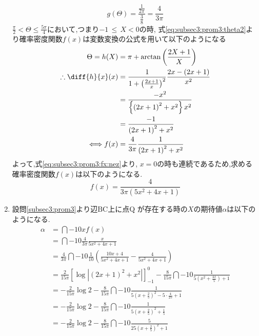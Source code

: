 \documentclass[dvipdfmx,titlepage, 11pt, a4paper]{jsarticle}%
\begin{document}
\begin{enumerate}[(1)]
  \begin{equation*}
    g(\Theta) = \frac{\frac{1}{2\pi}}{\frac{3}{8}} = \frac{4}{3\pi}
  \end{equation*}
  $\frac{\pi}{2} < \Theta \leq \frac{5\pi}{4}$において,つまり$ -1\, \leq\, X < 0$の時,
  式\eqref{eq:subsec3:prom3:theta2}より確率密度関数$f(x)$は変数変換の公式を用いて以下のようになる
  \begin{align}
    \Theta = h(X) &= \pi + \arctan\left(\frac{2X + 1}{X}\right) \nonumber\\
    \therefore \diff{h}{x}(x) &= \frac{1}{1 + \left(\frac{2x + 1}{x}\right)^2}\frac{2x - (2x + 1)}{x^2}\nonumber\\
                  &= \frac{-x^2}{\left\{\left(2x + 1\right)^2 + x^2\right\}x^2}\nonumber\\
                  &= \frac{-1}{\left(2x + 1\right)^2 + x^2}\nonumber\\
    \Longleftrightarrow 
    f(x) &= \frac{4}{3\pi}\frac{1}{\left(2x + 1\right)^2 + x^2}\label{eq:subsec3:prom3:fx:nez}
  \end{align}
  よって,式\eqref{eq:subsec3:prom3:fx:nez}より, $x=0$の時も連続であるため,求める確率密度関数$f(x)$は以下のようになる.
  \begin{equation*}
    f(x) = \frac{4}{3\pi(5x^2 + 4x + 1)}
  \end{equation*}
\item 設問\eqref{subsec3:prom3}より辺$\mathrm{BC}$上に点$\mathrm{Q}$
  が存在する時の$X$の期待値$\alpha$は以下のようになる.
  \begin{align*}
    \alpha &= \dint{-1}{0}{xf(x)}\\
          &= \dint{-1}{0}{\frac{4}{3\pi}\frac{x}{5x^2 + 4x + 1}}\\
          &= \frac{4}{3\pi}\dint{-1}{0}{\frac{1}{10}\left(\frac{10x + 4}{5x^2 + 4x + 1} - \frac{4}{5x^2 + 4x + 1}\right)}\\
          &= \frac{2}{15\pi}\left[\log |(2x + 1)^2 + x^2|\right]_{-1}^{0} - \frac{8}{15\pi}\dint{-1}{0}{\frac{1}{5(x^2 + \frac{4x}{5}) + 1}}\\
          &= -\frac{2}{15\pi}\log 2 - \frac{8}{15\pi}\dint{-1}{0}{\frac{1}{5(x + \frac{2}{5})^2 - 5\cdot \frac{4}{25} + 1}}\\
          &= -\frac{2}{15\pi}\log 2 - \frac{8}{15\pi}\dint{-1}{0}{\frac{1}{5(x + \frac{2}{5})^2 + \frac{1}{5}}}\\
          &= -\frac{2}{15\pi}\log 2 - \frac{8}{15\pi}\dint{-1}{0}{\frac{5}{25(x + \frac{2}{5})^2 + 1}}\\

\end{align*}
\end{enumerate}
\end{document}
